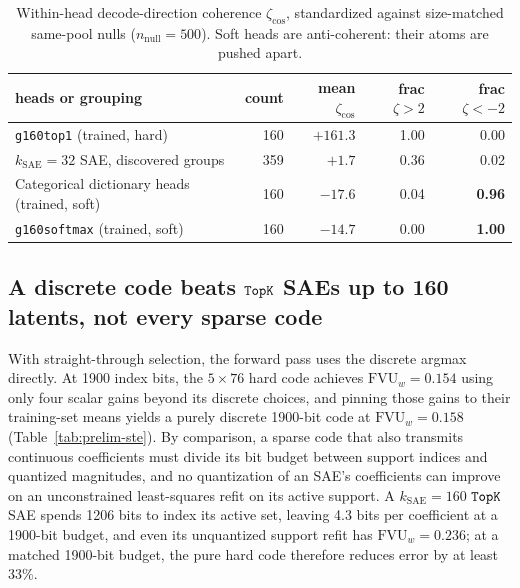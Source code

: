 \begin{table}[tp]\centering\small
\begin{tabular}{@{}lrrrr@{}}
\toprule
heads or grouping & count & mean $\zeta_{\cos}$ & frac $\zeta{>}2$ & frac $\zeta{<}{-}2$ \\
\midrule
\texttt{g160top1} (trained, hard)   & 160 & $+161.3$ & 1.00 & 0.00 \\
$k_{\mathrm{SAE}}{=}32$ SAE, discovered groups & 359 & $+1.7$ & 0.36 & 0.02 \\
Categorical dictionary heads (trained, soft) & 160 & $-17.6$ & 0.04 & \textbf{0.96} \\
\texttt{g160softmax} (trained, soft) & 160 & $-14.7$ & 0.00 & \textbf{1.00} \\
\bottomrule
\end{tabular}
\caption{Within-head decode-direction coherence $\zeta_{\cos}$,
standardized against size-matched same-pool nulls
($n_{\text{null}}{=}500$). Soft heads are
anti-coherent: their atoms are pushed apart.}
\label{tab:prelim-headcoh}
\end{table}

\subsection{A discrete code beats $\mathop{\mathtt{TopK}}\limits$ SAEs up to 160 latents, not every sparse code}
\label{sec:prelim-ste}
With straight-through selection, the forward pass uses the discrete
argmax directly. At 1900 index bits, the $5\times76$ hard code achieves
$\mathrm{FVU}_w = 0.154$ using only four scalar gains beyond its discrete
choices, and pinning those gains to their training-set means yields a
purely discrete 1900-bit code at $\mathrm{FVU}_w = 0.158$
(Table~\ref{tab:prelim-ste}). By comparison, a sparse code that also
transmits continuous coefficients must divide its bit budget between
support indices and quantized magnitudes, and no quantization of an SAE's
coefficients can improve on an unconstrained least-squares refit on its
active support. A $k_{\mathrm{SAE}}{=}160$ $\mathop{\mathtt{TopK}}\limits$ SAE spends 1206 bits to
index its active set, leaving 4.3 bits per coefficient at a 1900-bit
budget, and even its unquantized support refit has $\mathrm{FVU}_w = 0.236$;
at a matched 1900-bit budget, the pure hard code therefore reduces error
by at least 33\%.

